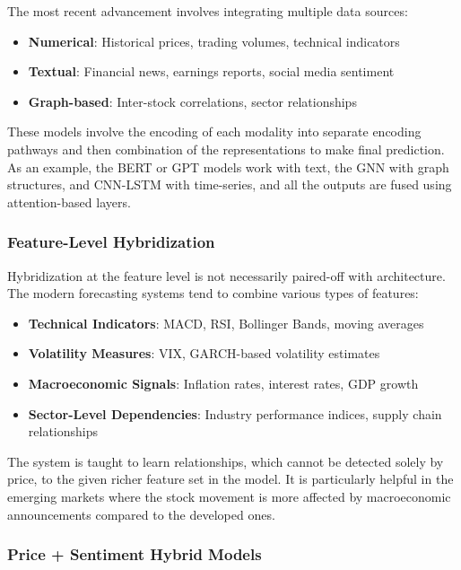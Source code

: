 The most recent advancement involves integrating multiple data sources:
\begin{itemize}
    \item \textbf{Numerical}: Historical prices, trading volumes, technical indicators
    \item \textbf{Textual}: Financial news, earnings reports, social media sentiment
    \item \textbf{Graph-based}: Inter-stock correlations, sector relationships
\end{itemize}

These models involve the encoding of each modality into separate encoding pathways and then combination of the representations to make final prediction. As an example, the BERT or GPT models work with text, the GNN with graph structures, and CNN-LSTM with time-series, and all the outputs are fused using attention-based layers.


\subsubsection{Feature-Level Hybridization}

Hybridization at the feature level is not necessarily paired-off with architecture. The modern forecasting systems tend to combine various types of features:
\begin{itemize}
    \item \textbf{Technical Indicators}: MACD, RSI, Bollinger Bands, moving averages
    \item \textbf{Volatility Measures}: VIX, GARCH-based volatility estimates
    \item \textbf{Macroeconomic Signals}: Inflation rates, interest rates, GDP growth
    \item \textbf{Sector-Level Dependencies}: Industry performance indices, supply chain relationships
\end{itemize}

The system is taught to learn relationships, which cannot be detected solely by price, to the given richer feature set in the model. It is particularly helpful in the emerging markets where the stock movement is more affected by macroeconomic announcements compared to the developed ones.

\subsubsection{Price + Sentiment Hybrid Models}

